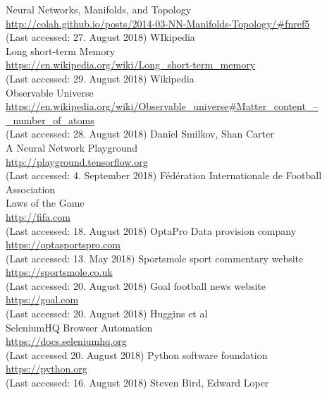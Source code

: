 \documentclass[10pt, a4paper]{UUThesisTemplate}
\begin{document}
\begin{thebibliography}{--}
     Neural Networks, Manifolds, and Topology\\
     \url{http://colah.github.io/posts/2014-03-NN-Manifolds-Topology/#fnref5}\\
     (Last accessed: 27. August 2018)
      WIkipedia\\
     Long short-term Memory\\
     \url{https://en.wikipedia.org/wiki/Long_short-term_memory}\\
     (Last accessed: 29. August 2018)
      Wikipedia\\
     Observable Universe\\
     \url{https://en.wikipedia.org/wiki/Observable_universe#Matter_content_–_number_of_atoms}\\
     (Last accessed: 28. August 2018)
      Daniel Smilkov, Shan Carter\\
     A Neural Network Playground\\
     \url{http://playground.tensorflow.org}\\
     (Last accessed: 4. September 2018)
      Fédération Internationale de Football Association\\
     Laws of the Game\\
     \url{http://fifa.com}\\
     (Last accessed: 18. August 2018)
     OptaPro Data provision company\\
    \url{https://optasportspro.com}\\
    (Last accessed: 13. May 2018)
     Sportsmole sport commentary website\\
    \url{https://sportsmole.co.uk}\\
    (Last accessed: 20. August 2018)
     Goal football news website\\
    \url{https://goal.com}\\
    (Last accessed: 20. August 2018)
     Huggins et al\\
    SeleniumHQ Browser Automation\\
    \url{https://docs.seleniumhq.org}\\
    (Last accessed 20. August 2018)
     Python software foundation\\
    \url{https://python.org}\\
    (Last accessed: 16. August 2018)
    Steven Bird, Edward Loper\\

\end{thebibliography}
\end{document}
